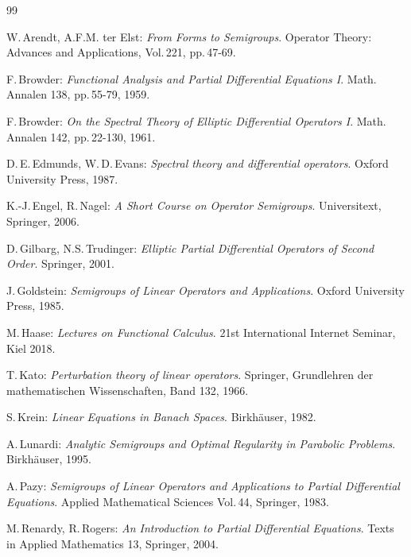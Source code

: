 \documentclass[11pt,twoside]{article}
\begin{document}

\vspace{4mm}
\begin{thebibliography}{99}
\begin{small}

 W.\,Arendt, A.F.M. ter Elst:
\textit{From Forms to Semigroups}.
Operator Theory: Advances and Applications, Vol.\,221, pp.\,47-69.

 F.\,Browder:
\textit{Functional Analysis and Partial Differential Equations I}.
Math. Annalen 138, pp.\,55-79, 1959.

 F.\,Browder:
\textit{On the Spectral Theory of Elliptic Differential Operators I}.
Math. Annalen 142, pp.\,22-130, 1961.

  D.\,E.\,Edmunds, W.\,D.\,Evans:
\textit{Spectral theory and differential operators}.
Oxford University Press, 1987.

  K.-J.\,Engel, R.\,Nagel:
\textit{A Short Course on Operator Semigroups}.
Universitext, Springer, 2006.

  D.\,Gilbarg, N.S.\,Trudinger:
\textit{Elliptic Partial Differential Operators of Second Order}.
Springer, 2001.

 J.\,Goldstein:
\textit{Semigroups of Linear Operators and Applications}.
Oxford University Press, 1985.

  M.\,Haase:
\textit{Lectures on Functional Calculus}.
21st International Internet Seminar, Kiel 2018.

  T.\,Kato:
\textit{{Perturbation theory of linear operators}}.
Springer, Grund\-lehren der mathematischen Wissenschaften, Band 132, 1966.

  S.\,Krein:
\textit{Linear Equations in Banach Spaces}.
Birk\-h\"{a}user, 1982.

  A.\,Lunardi:
\textit{Analytic Semigroups and Optimal Regularity in Parabolic Problems}.
Birk\-h\"{a}user, 1995.

  A.\,Pazy:
\textit{Semigroups of Linear Operators and
        Applications to Partial Differential Equations}.
Applied Mathematical Sciences Vol.\,44, Springer, 1983.

  M.\,Renardy, R.\,Rogers:
\textit{An Introduction to Partial Differential Equations}.
Texts in Applied Mathematics 13, Springer, 2004.


\end{small}
\end{thebibliography}
\end{document}
